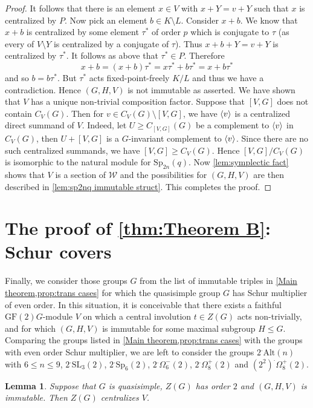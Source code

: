 \documentclass[12pt]{amsart}
\newtheorem{lemma}[theorem]{Lemma}
\theoremstyle{remark}
\theoremstyle{notation}
\theoremstyle{definition}
\newcommand{\GF}{\mathrm{GF}}
\newcommand{\Sp}{\mathrm{Sp}}
\newcommand{\SL}{\mathrm{SL}}
\newcommand{\0}{\emptyset}
\newcommand{\Alt}{\mathrm{Alt}}
\DeclarePairedDelimiter{\gen}{\langle}{\rangle}
\begin{document}
\begin{proof}
It follows that there is an element $x \in V$ with $x+Y = v+Y$ such that $x$ is centralized  by $P$. Now pick an element $b \in K \setminus L$.  Consider $x+b$.  We know that $x+b$ is centralized by some element $\tau^*$ of order $p$ which is conjugate to $\tau$ (as every of $V\setminus Y$ is centralized by a conjugate of $\tau$).  Thus $x+b+Y= v+Y$ is centralized by $\tau^*$.  It follows as above  that $\tau^* \in P$.  Therefore $$ x+b = (x+b)\tau^*=x\tau^*+b\tau^*=x+b\tau^*$$ and so $b=b\tau^*$.  But $\tau^*$ acts fixed-point-freely $K/L$ and thus we have a contradiction. Hence $(G,H,V)$ is not immutable as asserted.
We have shown that $V$ has a unique non-trivial composition factor. Suppose that $[V,G]$ does not contain $C_V(G)$. Then for $v \in C_V(G)\setminus [V,G]$, we have $\gen{v} $ is a centralized direct summand of $V$. Indeed, let $U \ge C_{[V,G]}(G)$ be a complement to $\gen{v}$ in $C_V(G)$, then $U+[V,G]$ is a $G$-invariant complement to $\gen{v}$. Since there are no such centralized summands, we have $[V,G]\ge C_V(G)$.
Hence $[V,G]/C_V(G)$ is isomorphic to the natural module for $\Sp_{2n}(q)$. Now \cref{lem:symplectic fact} shows that $V$ is a section of $\mathcal W$ and   the possibilities for $(G,H,V)$ are then described in \cref{lem:sp2nq immutable struct}. This completes the proof.
  \end{proof}



\section{The proof of \cref{thm:Theorem B}: Schur covers}\label{sec:schur}


Finally, we consider those groups $G$ from the list of immutable triples in \cref{Main theorem,prop:trans cases} for which the quasisimple group $G$ has Schur multiplier of even order. In this situation, it is conceivable that there exists a faithful $\GF(2)G$-module $V$ on which a central involution $t \in Z(G)$ acts non-trivially, and for which $(G,H,V)$ is immutable for some maximal subgroup $H \le G$. Comparing the  groups listed in \cref{Main theorem,prop:trans cases}  with the groups with even order Schur multiplier, we are left to consider the groups $2^.\Alt(n)$ with $6\le n\le 9$, $2^.\SL_3(2)$, $2^.\Sp_6(2)$, $2^.\Omega_6^-(2)$, $2^.\Omega_8^+ (2)$ and $(2^2)^.\Omega_8^+ (2)$.

\begin{lemma}\label{lem:CVt} Suppose that $G$ is quasisimple, $Z(G)$ has order $2$ and $(G,H,V)$ is immutable. Then $Z(G)$ centralizes $V$.
\end{lemma}
\end{document}
